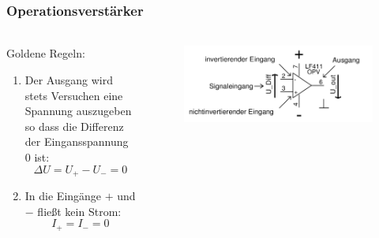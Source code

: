 \begin{frame}
    \frametitle{Operationsverstärker}
    \framesubtitle{}
    \begin{columns}[c]  
        \begin{block}{Goldene Regeln:}
             \begin{enumerate}
                 \item Der Ausgang wird stets Versuchen eine Spannung
                 auszugeben so dass die Differenz der Eingansspannung 0 ist:
                 \begin{equation*}
                     \Delta U = U_+ - U_- = 0
                 \end{equation*}
                 \item In die Eingänge $+$ und $-$ fließt kein Strom:
                 \begin{equation*}
                     I_+ = I_- = 0
                 \end{equation*}
             \end{enumerate}
        \end{block}
        \begin{figure}[H]
        \begin{center}
                \includegraphics[scale=0.12]{./img/misc/opv_schaltung.png}
        \end{center}
        \end{figure}
    \end{columns}
\end{frame}

